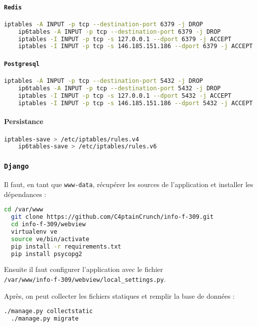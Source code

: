 \documentclass[10pt,a4paper]{article}
\begin{document}
\paragraph{\texttt{Redis}}
\begin{lstlisting}[language=bash]
	iptables -A INPUT -p tcp --destination-port 6379 -j DROP
	ip6tables -A INPUT -p tcp --destination-port 6379 -j DROP
	iptables -I INPUT -p tcp -s 127.0.0.1 --dport 6379 -j ACCEPT
	iptables -I INPUT -p tcp -s 146.185.151.186 --dport 6379 -j ACCEPT
\end{lstlisting}

\paragraph{\texttt{Postgresql}}
\begin{lstlisting}[language=bash]
	iptables -A INPUT -p tcp --destination-port 5432 -j DROP
	ip6tables -A INPUT -p tcp --destination-port 5432 -j DROP
	iptables -I INPUT -p tcp -s 127.0.0.1 --dport 5432 -j ACCEPT
	iptables -I INPUT -p tcp -s 146.185.151.186 --dport 5432 -j ACCEPT
\end{lstlisting}

\paragraph{Persistance}
\begin{lstlisting}[language=bash]
	iptables-save > /etc/iptables/rules.v4
	ip6tables-save > /etc/iptables/rules.v6
\end{lstlisting}

\subsubsection{\texttt{Django}}

Il faut, en tant que \texttt{www-data}, récupérer les sources de l'application et installer les dépendances :
\begin{lstlisting}[language=bash]
  cd /var/www
  git clone https://github.com/C4ptainCrunch/info-f-309.git
  cd info-f-309/webview
  virtualenv ve
  source ve/bin/activate
  pip install -r requirements.txt
  pip install psycopg2
\end{lstlisting}

Ensuite il faut configurer l'application avec le fichier\\\texttt{/var/www/info-f-309/webview/local\_settings.py}.

Après, on peut collecter les fichiers statiques et remplir la base de données :
\begin{lstlisting}[language=bash]
  ./manage.py collectstatic
  ./manage.py migrate
\end{lstlisting}
\end{document}
